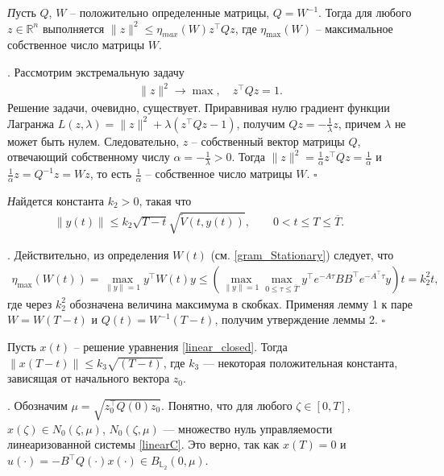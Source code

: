 \documentclass[../main.tex]{subfiles}
\begin{document}
	\begin{lemma}
		{\textit Пусть $Q$, $W$ -- положительно определенные матрицы, $Q = W^{-1}$. Тогда для любого $ z \in \mathbb{R}^n $ выполняется $\| z \|^2 \leqslant \eta_{max}(W)z^{\top}Qz$,
		  где $\eta_{\max}(W) $ -- максимальное собственное число матрицы  $W$}.
	\end{lemma}
	\doc. 
	Рассмотрим экстремальную задачу 
	\begin{gather*}
	\|z\|^2 \to \max , \quad z^{\top} Q z = 1. 
	\end{gather*}
	Решение задачи, очевидно, существует. Приравнивая нулю градиент функции Лагранжа $L(z,\lambda) = \| z\|^2 + \lambda (z^{\top}Qz - 1) $, получим $Qz = -\frac{1}{\lambda}z $, причем $\lambda$ не может быть нулем.
	Следовательно, $ z $ -- собственный вектор матрицы $ Q $, отвечающий собственному числу $ \alpha = -\frac{1}{\lambda} >0  $.
	Тогда $\| z \|^2 = \frac{1}{\alpha} z^{\top} Q z = \frac{1}{\alpha}$ и $\frac{1}{\alpha}z = Q^{-1} z = W z $, то есть $\frac{1}{\alpha} $ -- собственное число матрицы $ W $.
	\hfill $\square$
	\begin{lemma}
		{\textit Найдется константа $k_2>0$, такая что      \begin{gather*}
			\| y(t) \| \leqslant k_2 \sqrt{T - t} \sqrt{\widetilde{V}(t,y(t))}, \qquad 0 < t \leqslant T \leqslant \overline{T}. \qquad 
		\end{gather*}}
	\end{lemma}
	\doc.
	Действительно, из определения $W(t)$ (см. \eqref{gram_Stationary})  следует, что
	\begin{gather*}
		 \eta_{\max}(W(t)) = \max\limits_{\| y \| = 1} y^{\top} W(t) y \leqslant  \left(\max\limits_{\| y \| = 1} \max\limits_{0 \leqslant \tau  \leqslant \overline{T}} y^{\top} e^{-A\tau} B B^{\top} e^{-A^{\top}\tau} y\right)t = k_2^2 t,
	\end{gather*}
	где через $k_2^2$ обозначена величина максимума в скобках.
	Применяя лемму 1 к паре $ W  = W(T - t) $ и $ Q(t) = W^{-1}(T - t) $, получим утверждение леммы 2.
	\hfill $\square$
	\begin{lemma}\label{lem3} Пусть $x(t)$ -- решение уравнения \eqref{linear_closed}.
	Тогда $\|x(T - t) \| \leqslant k_3\sqrt{(T - t)} $, где $k_3$ --- некоторая положительная константа, зависящая  от  начального вектора $z_0$.
	 \end{lemma} 
	 \doc.
	 Обозначим $\mu=\sqrt{z_0^\top Q(0)z_0}$. 
	 Понятно, что для любого $\zeta \in [0,T]$, $x(\zeta) \in N_0(\zeta,\mu)$,   $N_0(\zeta,\mu)$ --- множество нуль управляемости линеаризованной системы \eqref{linearC}. Это верно, так как $x(T)=0$ и $u(\cdot)=-B^{\top}Q(\cdot)x(\cdot) \in B_{\mathbb{L}_2}(0,\mu)$.  
\end{document}
